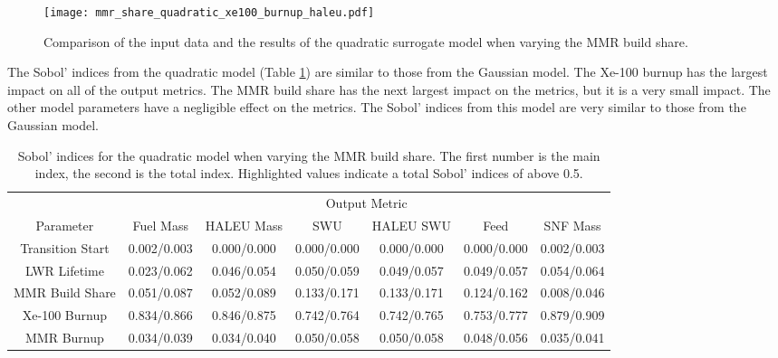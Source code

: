 \begin{figure}[h!]
    \centering 
    \texttt{[image: mmr\_share\_quadratic\_xe100\_burnup\_haleu.pdf]}
    \caption{Comparison of the input data and the results of the quadratic 
    surrogate model when varying the MMR build share.}
    \label{fig:s7_mmr_quadratic}
\end{figure}

The Sobol' indices from the quadratic model (Table 
\ref{tab:s7_sobol_mmr_quadratic}) are similar to those from the 
Gaussian model. The Xe-100 burnup has the largest impact on all of the 
output metrics. The \gls{MMR} build share has the next largest impact 
on the metrics, but it is a very small impact. The other model 
parameters have a negligible effect on the metrics. The Sobol' 
indices from this model are very similar to those from the Gaussian 
model. 

\begin{table}[h!]
    \centering
    \caption{Sobol' indices for the quadratic model when varying the MMR 
    build share. The first number is the main index, the second is the total 
    index. Highlighted 
    values indicate a total Sobol' indices of above 0.5.}
    \label{tab:s7_sobol_mmr_quadratic}
    \begin{tabular}{c c c c c c c}
        \hline
        & \multicolumn{6}{c}{Output Metric} \\
        Parameter & Fuel Mass & HALEU Mass & SWU & HALEU SWU & Feed & SNF Mass \\
        \hline
        Transition Start & 0.002/0.003 & 0.000/0.000 & 0.000/0.000 &
                        0.000/0.000 & 0.000/0.000 & 0.002/0.003\\
        LWR Lifetime & 0.023/0.062 & 0.046/0.054 & 0.050/0.059 &
                       0.049/0.057 & 0.049/0.057 & 0.054/0.064\\
        MMR Build Share & 0.051/0.087 & 0.052/0.089 & 0.133/0.171 &
                          0.133/0.171 & 0.124/0.162 & 0.008/0.046\\
        Xe-100 Burnup & \cellcolor{green!25}0.834/0.866 & \cellcolor{green!25}0.846/0.875 & \cellcolor{green!25}0.742/0.764 &
        \cellcolor{green!25}0.742/0.765 & \cellcolor{green!25}0.753/0.777 & \cellcolor{green!25}0.879/0.909\\
        MMR Burnup & 0.034/0.039 & 0.034/0.040 & 0.050/0.058 & 
                     0.050/0.058 & 0.048/0.056 & 0.035/0.041\\
        \hline        
    \end{tabular}
\end{table}

